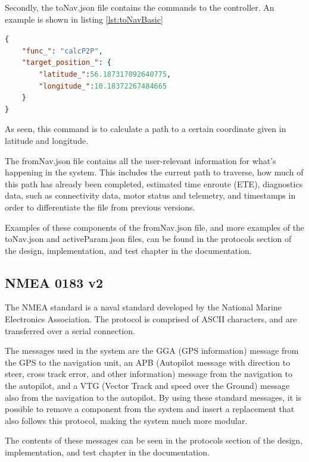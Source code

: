 Secondly, the toNav.json file contains the commands to the controller. An example is shown in listing \ref{lst:toNavBasic}

\begin{lstlisting}[caption = {Example of a calcP2P call in the toNav.JSON}, captionpos=b, label={lst:toNavCalcP2P}, language=json,firstnumber=1]
{
	"func_": "calcP2P",
	"target_position_": {
		"latitude_":56.187317092640775,
		"longitude_":10.18372267484665
	}
}
\end{lstlisting}

As seen, this command is to calculate a path to a certain coordinate given in latitude and longitude. 

The fromNav.json file contains all the user-relevant information for what's happening in the system. This includes the current path to traverse, how much of this path has already been completed, estimated time enroute (ETE), diagnostics data, such as connectivity data, motor status and telemetry, and timestamps in order to differentiate the file from previous versions.

 Examples of these components of the fromNav.json file, and more examples of the toNav.json and activeParam.json files, can be found in the protocols section of the design, implementation, and test chapter in the documentation.

\subsection{NMEA 0183 v2}

The NMEA standard is a naval standard developed by the National Marine Electronics Association. The protocol is comprised of ASCII characters, and are transferred over a serial connection. 

The messages used in the system are the GGA (GPS information) message from the GPS to the navigation unit, an APB (Autopilot message with direction to steer, cross track error, and other information) message from the navigation to the autopilot, and a VTG (Vector Track and speed over the Ground) message also from the navigation to the autopilot. By using these standard messages, it is possible to remove a component from the system and insert a replacement that also follows this protocol, making the system much more modular.

The contents of these messages can be seen in the protocols section of the design, implementation, and test chapter in the documentation. 

